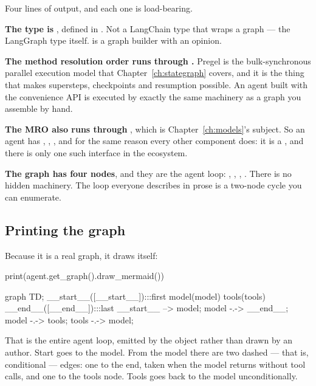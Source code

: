 Four lines of output, and each one is load-bearing.

\textbf{The type is }, defined in
. Not a LangChain type that wraps a graph --- the
LangGraph type itself.  is a graph builder with an opinion.

\textbf{The method resolution order runs through .} Pregel is the
bulk-synchronous parallel execution model that Chapter~\ref{ch:stategraph}
covers, and it is the thing that makes supersteps, checkpoints and resumption
possible. An agent built with the convenience API is executed by exactly the same
machinery as a graph you assemble by hand.

\textbf{The MRO also runs through }, which is
Chapter~\ref{ch:models}'s subject. So an agent has , ,
,  and  for the same reason every
other component does: it is a , and there is only one such
interface in the ecosystem.

\textbf{The graph has four nodes}, and they are the agent loop:
, , , . There is no
hidden machinery. The loop everyone describes in prose is a two-node cycle you
can enumerate.

\subsection{Printing the graph}
\label{sec:printing-graph}

Because it is a real graph, it draws itself:

\begin{python}[caption={The agent loop, rendered by the agent}, label={lst:draw-mermaid}]
print(agent.get_graph().draw_mermaid())
\end{python}

\begin{console}
graph TD;
        __start__([__start__]):::first
        model(model)
        tools(tools)
        __end__([__end__]):::last
        __start__ --> model;
        model -.-> __end__;
        model -.-> tools;
        tools -.-> model;
\end{console}

That is the entire agent loop, emitted by the object rather than drawn by an
author. Start goes to the model. From the model there are two dashed --- that is,
conditional --- edges: one to the end, taken when the model returns without tool
calls, and one to the tools node. Tools goes back to the model unconditionally.

